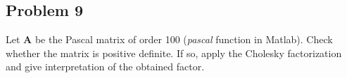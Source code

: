 \subsection{Problem 9}
Let  $\mathbf{A}$  be  the  Pascal  matrix  of  order  100  (\textit{pascal}  function  in Matlab).  Check  whether the matrix is positive definite. If so, apply the Cholesky factorization and give interpretation of the obtained factor.

